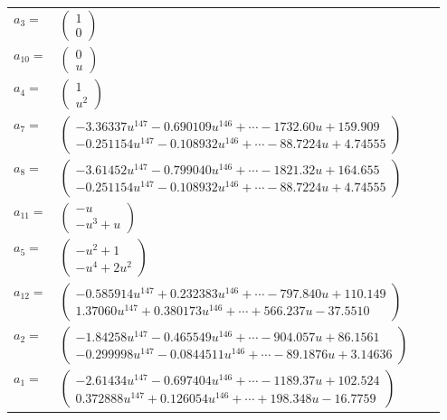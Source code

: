 \documentclass[1p]{elsarticle_modified}
\theoremstyle{definition}
\begin{document}
\begin{tabular}{m{7pt} m{180pt} m{7pt} m{180pt} }
\flushright $a_{3}=$&$\begin{pmatrix}1\\0\end{pmatrix}$ \\
\flushright $a_{10}=$&$\begin{pmatrix}0\\u\end{pmatrix}$ \\
\flushright $a_{4}=$&$\begin{pmatrix}1\\u^2\end{pmatrix}$ \\
\flushright $a_{7}=$&$\begin{pmatrix}-3.36337 u^{147}-0.690109 u^{146}+\cdots-1732.60 u+159.909\\-0.251154 u^{147}-0.108932 u^{146}+\cdots-88.7224 u+4.74555\end{pmatrix}$ \\
\flushright $a_{8}=$&$\begin{pmatrix}-3.61452 u^{147}-0.799040 u^{146}+\cdots-1821.32 u+164.655\\-0.251154 u^{147}-0.108932 u^{146}+\cdots-88.7224 u+4.74555\end{pmatrix}$ \\
\flushright $a_{11}=$&$\begin{pmatrix}- u\\- u^3+u\end{pmatrix}$ \\
\flushright $a_{5}=$&$\begin{pmatrix}- u^2+1\\- u^4+2 u^2\end{pmatrix}$ \\
\flushright $a_{12}=$&$\begin{pmatrix}-0.585914 u^{147}+0.232383 u^{146}+\cdots-797.840 u+110.149\\1.37060 u^{147}+0.380173 u^{146}+\cdots+566.237 u-37.5510\end{pmatrix}$ \\
\flushright $a_{2}=$&$\begin{pmatrix}-1.84258 u^{147}-0.465549 u^{146}+\cdots-904.057 u+86.1561\\-0.299998 u^{147}-0.0844511 u^{146}+\cdots-89.1876 u+3.14636\end{pmatrix}$ \\
\flushright $a_{1}=$&$\begin{pmatrix}-2.61434 u^{147}-0.697404 u^{146}+\cdots-1189.37 u+102.524\\0.372888 u^{147}+0.126054 u^{146}+\cdots+198.348 u-16.7759\end{pmatrix}$ \\

\end{tabular}
\end{document}
